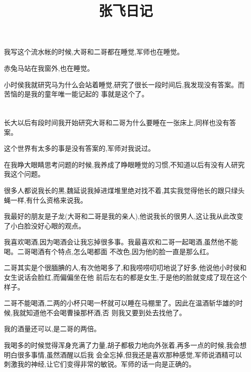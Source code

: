 ﻿\documentclass[12pt,twocolumn]{article}
\title{张飞日记}
\author{}
\date{}
\begin{document}
\twocolumn[
\begin{@twocolumnfalse}
\maketitle\thispagestyle{empty}
\end{@twocolumnfalse}
]

\clearpage


\section{}

我写这个流水帐的时候,大哥和二哥都在睡觉,军师也在睡觉。

赤兔马站在我窗外,也在睡觉。

小时侯我就研究马为什么会站着睡觉,研究了很长一段时间后,我发现没有答案。而苦恼的是我的童年唯一能记起的
事就是这个了。

\section{}

长大以后有段时间我开始研究大哥和二哥为什么要睡在一张床上,同样也没有答案。

这个世界有太多的事是没有答案的,军师对我说过。

在我睁大眼睛思考问题的时候,我养成了睁眼睡觉的习惯,不知道以后有没有人研究我这个问题。

很多人都说我长的黑,魏延说我掉进煤堆里绝对找不着,其实我觉得他长的跟只绿头蝇一样,有什么资格来说我。

我最好的朋友是子龙(大哥和二哥是我的亲人),他说我长的很男人,这让我从此改变了小白脸没好心眼的观点。

我喜欢喝酒,因为喝酒会让我忘掉很多事。我最喜欢和二哥一起喝酒,虽然他不能喝。二哥喝酒有个特点,怎么喝都面
不改色,因为他的脸一直是那么红。

二哥其实是个很腼腆的人,有次他喝多了,和我唠唠叨叨地说了好多,他说他小时侯和女生说话会脸红,而偏偏坐在他
前后左右的都是女生,于是他的脸就变成了现在这个样子。

二哥不能喝酒,二两的小杯只喝一杯就可以睡在马棚里了。因此在温酒斩华雄的时候,我就知道他不会喝曹操那杯酒,否
则我又要到处去找他了。

我的酒量还可以,是二哥的两倍。

我喝多的时候觉得浑身充满了力量,胡子都极力地向外张着,再多一点的时候,我会想明白很多事情,虽然酒醒以后我
会全忘掉,但我还是喜欢那种感觉,军师说酒精可以刺激我的神经,让它们变得非常的敏锐。军师的话一向是正确的。
\end{document}
